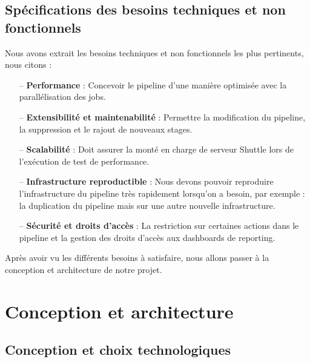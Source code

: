 \begin{spacing}{1.2}
\subsection{Spécifications des besoins techniques et non fonctionnels}
Nous avons extrait les besoins techniques et non fonctionnels les plus pertinents, nous citons : 
\begin{itemize}
    \setlength\itemsep{0em}
    \item[--] \textbf{Performance} : Concevoir le pipeline d'une manière optimisée avec la parallélisation des jobs.
    \item[--] \textbf{Extensibilité et maintenabilité} : Permettre la modification du pipeline, la suppression et le rajout de nouveaux stages. 
    \item[--] \textbf{Scalabilité} : Doit assurer la monté en charge de serveur Shuttle lors de l'exécution de test de performance.
    \item[--] \textbf{Infrastructure reproductible} :
    Nous devons pouvoir reproduire l'infrastructure du pipeline très rapidement lorsqu'on a besoin, par exemple : la duplication du pipeline mais sur une autre nouvelle infrastructure. 
    \item[--] \textbf{Sécurité et droits d’accès} : La restriction sur certaines actions dans le pipeline et la gestion des droits d'accès aux dashboards de reporting.
\end{itemize}
Après avoir vu les différents besoins à satisfaire, nous allons passer à la conception et architecture de notre projet.
\section{Conception et architecture}
\subsection{Conception et choix technologiques}

\end{spacing}
